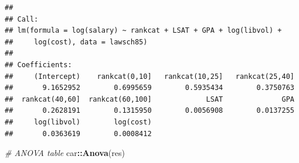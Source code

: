 \documentclass[]{book}
\newenvironment{Shaded}{\begin{snugshade}}{\end{snugshade}}
\newcommand{\CommentTok}[1]{\textcolor[rgb]{0.56,0.35,0.01}{\textit{#1}}}
\newcommand{\KeywordTok}[1]{\textcolor[rgb]{0.13,0.29,0.53}{\textbf{#1}}}
\newcommand{\NormalTok}[1]{#1}
\newcommand{\OperatorTok}[1]{\textcolor[rgb]{0.81,0.36,0.00}{\textbf{#1}}}
\begin{document}
\begin{verbatim}
## 
## Call:
## lm(formula = log(salary) ~ rankcat + LSAT + GPA + log(libvol) + 
##     log(cost), data = lawsch85)
## 
## Coefficients:
##     (Intercept)    rankcat(0,10]   rankcat(10,25]   rankcat(25,40]  
##       9.1652952        0.6995659        0.5935434        0.3750763  
##  rankcat(40,60]  rankcat(60,100]             LSAT              GPA  
##       0.2628191        0.1315950        0.0056908        0.0137255  
##     log(libvol)        log(cost)  
##       0.0363619        0.0008412
\end{verbatim}

\begin{Shaded}
\begin{Highlighting}[]
\CommentTok{# ANOVA table}
\NormalTok{car}\OperatorTok{::}\KeywordTok{Anova}\NormalTok{(res)}
\end{Highlighting}
\end{Shaded}
\end{document}
